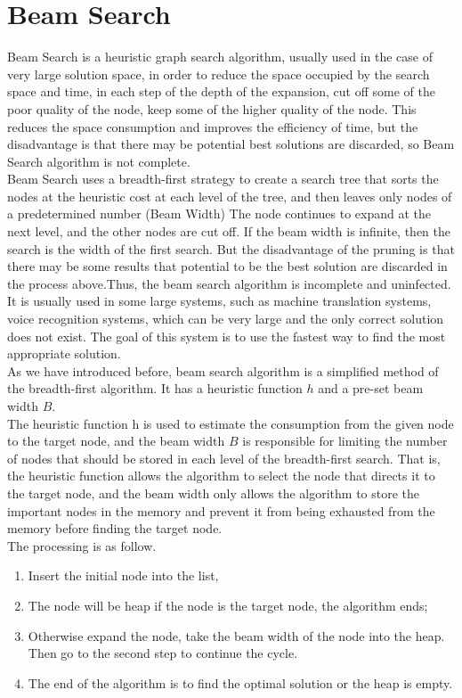 \section{Beam Search}
Beam Search is a heuristic graph search algorithm, usually used in the case of very large solution space, in order to reduce the space occupied by the search space and time, in each step of the depth of the expansion, cut off some of the poor quality of the node, keep some of the higher quality of the node. This reduces the space consumption and improves the efficiency of time, but the disadvantage is that there may be potential best solutions are discarded, so Beam Search algorithm is not complete.\\
Beam Search uses a breadth-first strategy to create a search tree that sorts the nodes at the heuristic cost at each level of the tree, and then leaves only nodes of a predetermined number (Beam Width) The node continues to expand at the next level, and the other nodes are cut off. If the beam width is infinite, then the search is the width of the first search. But the disadvantage of the pruning is that there may be some results that potential to be the best solution are discarded in the process above.Thus, the beam search algorithm is incomplete and uninfected. It is usually used in some large systems, such as machine translation systems, voice recognition systems, which can be very large and the only correct solution does not exist. The goal of this system is to use the fastest way to find the most appropriate solution.\\
As we have introduced before, beam search algorithm is a simplified method of the breadth-first algorithm. It has a heuristic function $h$ and a pre-set beam width $B$.\\
The heuristic function h is used to estimate the consumption from the given node to the target node, and the beam width $B$ is responsible for limiting the number of nodes that should be stored in each level of the breadth-first search. That is, the heuristic function allows the algorithm to select the node that directs it to the target node, and the beam width only allows the algorithm to store the important nodes in the memory and prevent it from being exhausted from the memory before finding the target node.\\
The processing is as follow.\\
\begin{enumerate}
\item Insert the initial node into the list,
\item The node will be heap if the node is the target node, the algorithm ends;
\item Otherwise expand the node, take the beam width of the node into the heap. Then go to the second step to continue the cycle.
\item The end of the algorithm is to find the optimal solution or the heap is empty.
\end{enumerate}
